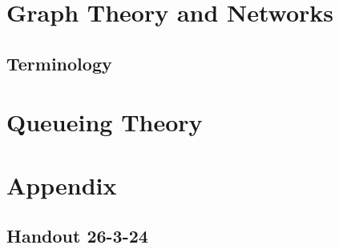 \chapter{Graph Theory and Networks}
\section{Terminology}



\chapter{Queueing Theory}














\newpage
\chapter{Appendix}
\section{Handout 26-3-24}\label{handout 3.26}




